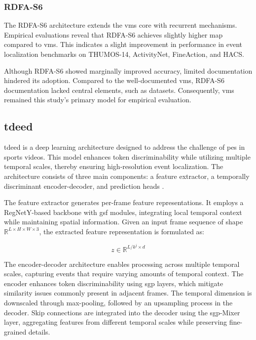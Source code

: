 \subsubsection{RDFA-S6}
The RDFA-S6 architecture extends the \acrshort{vms} core with recurrent mechanisms. Empirical evaluations reveal that RDFA-S6 achieves slightly higher \acrlong{map} compared to \acrshort{vms}. This indicates a slight improvement in performance in event localization benchmarks on THUMOS-14, ActivityNet, FineAction, and HACS. 

Although RDFA-S6 showed marginally improved accuracy, limited documentation hindered its adoption. Compared to the well-documented \acrlong{vms}, RDFA-S6 documentation lacked central elements, such as datasets. Consequently, \acrshort{vms} remained this study's primary model for empirical evaluation. 


\subsection{\acrfull{tdeed}}
\label{ssec:tdeed}

\acrfull{tdeed} is a deep learning architecture designed to address the challenge of \acrfull{pes} in sports videos. This model enhances token discriminability while utilizing multiple temporal scales, thereby ensuring high-resolution event localization. The architecture consists of three main components: a feature extractor, a temporally discriminant encoder-decoder, and prediction heads \cite{xarles_t-deed_2024}.

The feature extractor generates per-frame feature representations. It employs a RegNetY-based backbone with \acrfull{gsf} modules, integrating local temporal context while maintaining spatial information. Given an input frame sequence of shape \(\mathbb{R}^{L \times H \times W \times 3}\), the extracted feature representation is formulated as:

\[
z \in \mathbb{R}^{L/{k^j \times d} }
\]

The encoder-decoder architecture enables processing across multiple temporal scales, capturing events that require varying amounts of temporal context. The encoder enhances token discriminability using \acrfull{sgp} layers, which mitigate similarity issues commonly present in adjacent frames. The temporal dimension is downscaled through max-pooling, followed by an upsampling process in the decoder. Skip connections are integrated into the decoder using the \acrshort{sgp}-Mixer layer, aggregating features from different temporal scales while preserving fine-grained details.

